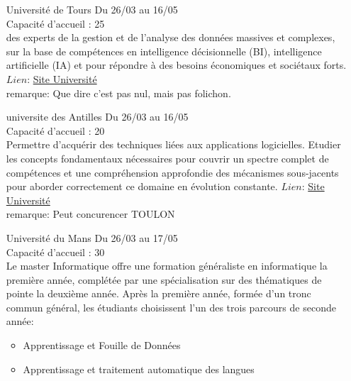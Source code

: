 \documentclass[a4paper,11pt]{article}
\begin{document}
\begin{enumerate}
\\
        \item [\color{LightOrangeHaf}Université de Tours] Du 26/03 au 16/05
                    \\Capacité d'accueil : 25
                    \\des experts de la gestion et de l’analyse des données massives et complexes, sur la base de compétences en intelligence décisionnelle (BI), intelligence artificielle (IA) et pour répondre à des besoins économiques et sociétaux forts.
                    $Lien$: \href{https://www.univ-tours.fr/formations/master-sciences-technologies-sante-mention-informatique-parcours-big-data-management-and-analytics}{Site Université}
                    \\ remarque: Que dire c'est pas nul, mais pas folichon.
\\
        \item [\color{LightOrangeHaf}universite des Antilles] Du 26/03 au 16/05
                    \\Capacité d'accueil : 20
                    \\Permettre d’acquérir des techniques liées aux applications logicielles. Etudier les concepts fondamentaux nécessaires pour couvrir un spectre complet de compétences et une compréhension approfondie des mécanismes sous-jacents pour aborder correctement ce domaine en évolution constante.
                    $Lien$: \href{http://www.univ-antilles.fr/offre-formations/offre-formation-luniversite-des-antilles}{Site Université}
                    \\ remarque: Peut concurencer TOULON
\\
        \item [\color{LightOrangeHaf}Université du Mans] Du 26/03 au 17/05
                    \\Capacité d'accueil : 30
                    \\Le master Informatique offre une formation généraliste en informatique la première année, complétée par une spécialisation sur des thématiques de pointe la deuxième année.  Après la première année, formée d’un tronc commun général, les étudiants choisissent l’un des trois parcours de seconde année:
                    \begin{itemize}
                        \item Apprentissage et Fouille de Données
                        \item Apprentissage et traitement automatique des langues
                    \end{itemize}

\end{enumerate}
\end{document}
